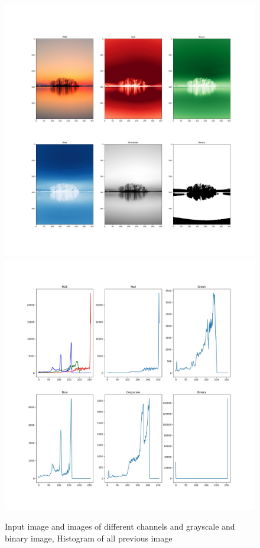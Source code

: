 \documentclass{article}
\begin{document}
{{        \begin{figure}[htp]
            \centering
            \includegraphics[width=.70\textwidth]{Assignment-1/fig-1.jpg}
            \includegraphics[width=.70\textwidth]{Assignment-1/fig-2.jpg}
            \caption{Input image and images of different channels and grayscale and binary image, Histogram of all previous image}
        \end{figure}
    }
}
\clearpage
\end{document}
